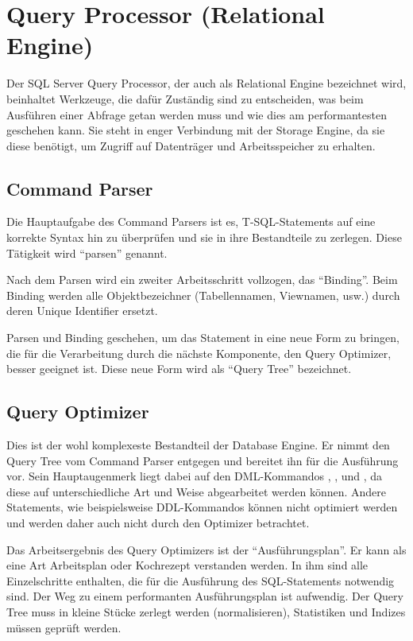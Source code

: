     \section{Query Processor (Relational Engine)}
      \label{relengine}
      Der SQL Server Query Processor, der auch als Relational Engine bezeichnet
      wird, beinhaltet Werkzeuge, die dafür Zuständig sind zu entscheiden, 
      was beim Ausführen einer Abfrage getan werden muss und wie dies am 
      performantesten geschehen kann. Sie steht in enger Verbindung mit der 
      Storage Engine, da sie diese benötigt, um Zugriff auf Datenträger und 
      Arbeitsspeicher zu erhalten.
      \subsection{Command Parser}
        Die Hauptaufgabe des Command Parsers ist es, T-SQL-Statements auf eine
        korrekte Syntax hin zu überprüfen und sie in ihre Bestandteile zu 
        zerlegen. Diese Tätigkeit wird \enquote{parsen} genannt.
        
        Nach dem Parsen wird ein zweiter Arbeitsschritt vollzogen, das
        \enquote{Binding}. Beim Binding werden alle Objektbezeichner
        (Tabellennamen, Viewnamen, usw.) durch deren Unique
        Identifier ersetzt.
        
        Parsen und Binding geschehen, um das Statement in eine neue Form zu
        bringen, die für die Verarbeitung durch die nächste Komponente,
        den Query Optimizer, besser geeignet ist. Diese neue Form wird als 
        \enquote{Query Tree} bezeichnet.
      \subsection{Query Optimizer}
        Dies ist der wohl komplexeste Bestandteil der Database Engine. Er nimmt 
        den Query Tree vom Command Parser entgegen und bereitet ihn für die 
        Ausführung vor. Sein Hauptaugenmerk liegt dabei auf den DML-Kommandos 
        , , 
        und , da diese auf unterschiedliche Art und Weise 
        abgearbeitet werden können. Andere Statements, wie beispielsweise
        DDL-Kommandos können nicht optimiert werden und werden daher auch
        nicht durch den Optimizer betrachtet.

        Das Arbeitsergebnis des Query Optimizers ist der
        \enquote{Ausführungsplan}. Er kann als eine Art Arbeitsplan oder
        Kochrezept verstanden werden. In ihm sind alle Einzelschritte enthalten,
        die für die Ausführung des SQL-Statements notwendig sind. Der Weg zu
        einem performanten Ausführungsplan ist aufwendig. Der Query Tree muss 
        in kleine Stücke zerlegt werden (normalisieren), Statistiken und
        Indizes müssen geprüft werden.

